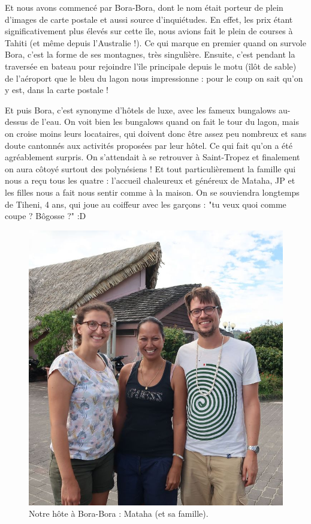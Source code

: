 Et nous avons commencé par Bora-Bora, dont le nom était porteur de plein
d'images de carte postale et aussi source d'inquiétudes. En effet, les
prix étant significativement plus élevés sur cette île, nous avions fait
le plein de courses à Tahiti (et même depuis l'Australie !). Ce qui
marque en premier quand on survole Bora, c'est la forme de ses
montagnes, très singulière. Ensuite, c'est pendant la traversée en
bateau pour rejoindre l'île principale depuis le motu (îlôt de sable) de
l'aéroport que le bleu du lagon nous impressionne : pour le coup on sait
qu'on y est, dans la carte postale !

Et puis Bora, c'est synonyme d'hôtels de luxe, avec les fameux bungalows
au-dessus de l'eau. On voit bien les bungalows quand on fait le tour du
lagon, mais on croise moins leurs locataires, qui doivent donc être
assez peu nombreux et sans doute cantonnés aux activités proposées par
leur hôtel. Ce qui fait qu'on a été agréablement surpris. On s'attendait
à se retrouver à Saint-Tropez et finalement on aura côtoyé surtout des
polynésiens ! Et tout particulièrement la famille qui nous a reçu tous
les quatre : l'accueil chaleureux et généreux de Mataha, JP et les
filles nous a fait nous sentir comme à la maison. On se souviendra
longtemps de Tiheni, 4 ans, qui joue au coiffeur avec les garçons : "tu
veux quoi comme coupe ? Bôgosse ?" :D

\begin{figure}
\centering
\includegraphics{images/20180820_mataha.JPG}
\caption{Notre hôte à Bora-Bora : Mataha (et sa famille).}
\end{figure}

